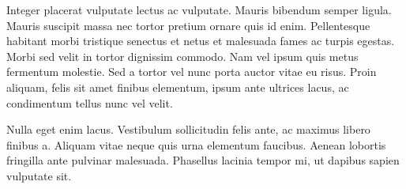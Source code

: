 \documentclass[../main.tex]{subfiles}
\begin{document}
Integer placerat vulputate lectus ac vulputate. Mauris bibendum semper ligula. Mauris suscipit massa nec tortor pretium ornare quis id enim. Pellentesque habitant morbi tristique senectus et netus et malesuada fames ac turpis egestas. Morbi sed velit in tortor dignissim commodo. Nam vel ipsum quis metus fermentum molestie. Sed a tortor vel nunc porta auctor vitae eu risus. Proin aliquam, felis sit amet finibus elementum, ipsum ante ultrices lacus, ac condimentum tellus nunc vel velit.

Nulla eget enim lacus. Vestibulum sollicitudin felis ante, ac maximus libero finibus a. Aliquam vitae neque quis urna elementum faucibus. Aenean lobortis fringilla ante pulvinar malesuada. Phasellus lacinia tempor mi, ut dapibus sapien vulputate sit. 


\printbibliography
\end{document}
